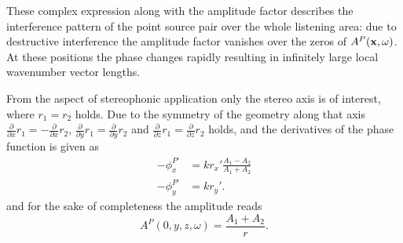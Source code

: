 These complex expression along with the amplitude factor describes the interference pattern of the point source pair over the whole listening area: 
due to destructive interference the amplitude factor vanishes over the zeros of $A^P(\mathbf{x},\omega)$.
At these positions the phase changes rapidly resulting in infinitely large local wavenumber vector lengths.

From the aspect of stereophonic application only the stereo axis is of interest, where $r_1 = r_2$ holds.
Due to the symmetry of the geometry along that axis $\frac{\partial}{\partial x} r_1 = - \frac{\partial}{\partial x} r_2$, $\frac{\partial}{\partial y} r_1 = \frac{\partial}{\partial y} r_2$ and $\frac{\partial}{\partial z} r_1 = \frac{\partial}{\partial z} r_2$ holds, and the derivatives of the phase function is given as
\begin{align}
-\phi^{P'}_x &= k r_x' \frac{ A_1  - A_2 
 }{ A_1 + A_2} \\
-\phi^{P'}_y &= k r_y'.
\end{align}
and for the sake of completeness the amplitude reads
\begin{equation}
A^P(0,y,z,\omega) = \frac{A_1 +  A_2}{r}.
\label{Eq:AppB:stereo_amplitude}
\end{equation}